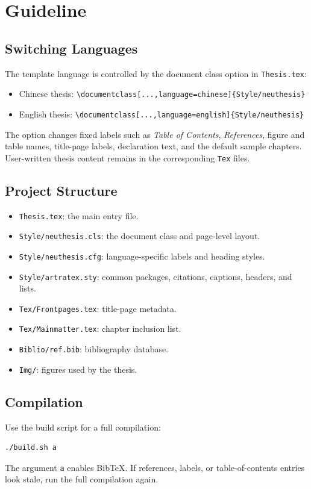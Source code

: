 \chapter{Guideline}\label{chap:guide}

\section{Switching Languages}

The template language is controlled by the document class option in \texttt{Thesis.tex}:

\begin{itemize}
    \item Chinese thesis: \verb|\documentclass[...,language=chinese]{Style/neuthesis}|
    \item English thesis: \verb|\documentclass[...,language=english]{Style/neuthesis}|
\end{itemize}

The option changes fixed labels such as \textit{Table of Contents}, \textit{References}, figure and table names, title-page labels, declaration text, and the default sample chapters. User-written thesis content remains in the corresponding \texttt{Tex} files.

\section{Project Structure}

\begin{itemize}
    \item \texttt{Thesis.tex}: the main entry file.
    \item \texttt{Style/neuthesis.cls}: the document class and page-level layout.
    \item \texttt{Style/neuthesis.cfg}: language-specific labels and heading styles.
    \item \texttt{Style/artratex.sty}: common packages, citations, captions, headers, and lists.
    \item \texttt{Tex/Frontpages.tex}: title-page metadata.
    \item \texttt{Tex/Mainmatter.tex}: chapter inclusion list.
    \item \texttt{Biblio/ref.bib}: bibliography database.
    \item \texttt{Img/}: figures used by the thesis.
\end{itemize}

\section{Compilation}\label{sec:qa}

Use the build script for a full compilation:

\begin{verbatim}
./build.sh a
\end{verbatim}

The argument \texttt{a} enables Bib\TeX{}. If references, labels, or table-of-contents entries look stale, run the full compilation again.
